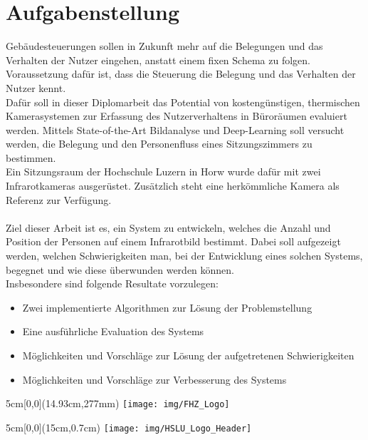 \documentclass[
	a4paper
]{scrartcl}
\begin{document}
\section{Aufgabenstellung}
Gebäudesteuerungen sollen in Zukunft mehr auf die Belegungen und das Verhalten der Nutzer eingehen, anstatt einem fixen Schema zu folgen. Voraussetzung dafür ist, dass die Steuerung die Belegung und das Verhalten der Nutzer kennt.\\
Dafür soll in dieser Diplomarbeit das Potential von kostengünstigen, thermischen Kamerasystemen zur Erfassung des Nutzerverhaltens in Büroräumen evaluiert werden. Mittels State-of-the-Art Bildanalyse und Deep-Learning soll versucht werden, die Belegung und den Personenfluss eines Sitzungszimmers zu bestimmen.\\
Ein Sitzungsraum der Hochschule Luzern in Horw wurde dafür mit zwei Infrarotkameras ausgerüstet. Zusätzlich steht eine herkömmliche Kamera als Referenz zur Verfügung.\\
\\
Ziel dieser Arbeit ist es, ein System zu entwickeln, welches die Anzahl und Position der Personen auf einem Infrarotbild bestimmt. Dabei soll aufgezeigt werden, welchen Schwierigkeiten man, bei der Entwicklung eines solchen Systems, begegnet und wie diese überwunden werden können.\\
Insbesondere sind folgende Resultate vorzulegen:
\begin{itemize}
	\item Zwei implementierte Algorithmen zur Lösung der Problemstellung
	\item Eine ausführliche Evaluation des Systems
	\item Möglichkeiten und Vorschläge zur Lösung der aufgetretenen Schwierigkeiten 
	\item  Möglichkeiten und Vorschläge zur Verbesserung des Systems
\end{itemize}

\vspace{0.5em}
\noindent
\begin{textblock*}{5cm}[0,0](14.93cm,277mm)
	\texttt{[image: img/FHZ\_Logo]}
\end{textblock*}

\newpage

\begin{textblock*}{5cm}[0,0](15cm,0.7cm)
	\texttt{[image: img/HSLU\_Logo\_Header]}
\end{textblock*}
\end{document}
